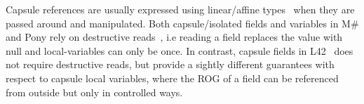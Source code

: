 Capsule references are usually expressed using linear/affine types~\cite{boyland2001alias} when they are passed around and manipulated. Both capsule/isolated fields and variables in M\# and Pony rely on destructive reads~\cite{GordonEtAl12,clebsch2015deny}, i.e reading a field replaces the value with null and local-variables can only be once. In contrast, capsule fields in L42~\cite{ServettoEtAl13a,ServettoZucca15} does not require destructive reads, but provide a sightly different guarantees with respect to capsule local variables, where the ROG of a \Q@capsule@ field can be referenced from outside but only in controlled ways.



